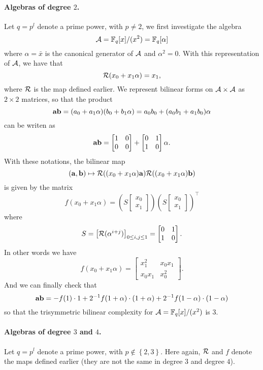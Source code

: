 \documentclass[a4paper,11pt]{article}
\begin{document}
\paragraph{Algebras of degree $2$.} Let $q=p^l$ denote a prime power, with
$p\neq 2$, we first investigate the algebra
\[
  \mathcal{A} = \mathbb{F}_q[x]/(x^2) =\mathbb{F}_q[\alpha]
\]
where $\alpha=\bar x$ is the canonical generator of $\mathcal{A}$ and $\alpha^2=0$.
With this representation of $\mathcal{A}$, we have that
\[
  \mathcal{R}(x_0 + x_1\alpha) = x_1,
\]
where $\mathcal{R}$ is the map defined earlier.
We represent
bilinear forms on $\mathcal{A}\times\mathcal{A}$ as $2\times2$
matrices, so that the product
\[
  \mathbf{a}\mathbf{b} = (a_0+a_1\alpha)(b_0+b_1\alpha)=a_0b_0+(a_0b_1+a_1b_0)\alpha
\]
can be writen as
\[
  \mathbf{a}\mathbf{b} = 
  \begin{bmatrix}
    1 & 0 \\
    0 & 0
  \end{bmatrix}
  +
  \begin{bmatrix}
    0 & 1 \\
    1 & 0
  \end{bmatrix}\alpha.
\]
With these notations, the bilinear map 
\[
  (\mathbf{a}, \mathbf{b})\mapsto \mathcal{R}((x_0+x_1\alpha)\mathbf{a})\mathcal{R}((x_0+x_1\alpha)\mathbf{b})
\]
is given by the matrix 
\[
  f(x_0+x_1\alpha)=
  \left(S 
  \begin{bmatrix}
    x_0 \\
    x_1
  \end{bmatrix}\right)
  \left(S 
  \begin{bmatrix}
    x_0 \\
    x_1
  \end{bmatrix}\right)^\intercal
\]
where
\[
  S =
  \begin{bmatrix}
    \mathcal{R}(\alpha^{i+j})
  \end{bmatrix}_{0\leq i, j\leq 1}
  =
  \begin{bmatrix}
   0 & 1 \\
   1 & 0
  \end{bmatrix}.
\]
In other words we have
\[
  f(x_0+x_1\alpha) = 
  \begin{bmatrix}
   x_1^2 & x_0x_1 \\
   x_0 x_1 & x_0^2
  \end{bmatrix}.
\]
And we can finally check that
\[
  \mathbf{a}\mathbf{b} = -f(1)\cdot1 +
  2^{-1}f(1+\alpha)\cdot(1+\alpha)+2^{-1}f(1-\alpha)\cdot(1-\alpha)
\]
so that the trisymmetric bilinear complexity for
$\mathcal{A}=\mathbb{F}_q[x]/(x^2)$ is $3$.

\paragraph{Algebras of degree $3$ and $4$.} Let $q=p^l$ denote a prime power,
with $p\notin\left\{ 2, 3 \right\}$. Here again, $\mathcal{R}$ and $f$ denote the maps defined
earlier (they are not the same in degree $3$ and degree $4$).
\end{document}
